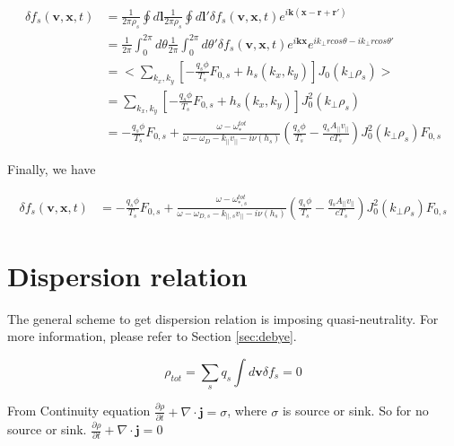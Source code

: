 \begin{equation}
\begin{aligned}
    \delta f_s(\textbf{v},\textbf{x},t){}&=
    \frac{1}{2\pi \rho_s}\oint d \textbf{l}
    \frac{1}{2\pi \rho_s}\oint d \textbf{l}'
    \delta f_s(\textbf{v},\textbf{x},t)e^{i\textbf{k}(\textbf{x}-\textbf{r}+\textbf{r}')}\\
    &=\frac{1}{2\pi}\int ^{2\pi}_{0}d \theta
    \frac{1}{2\pi}\int ^{2\pi}_{0}d \theta'
    \delta f_s(\textbf{v},\textbf{x},t)
    e^{i\textbf{kx}}e^{ik_\perp rcos\theta - ik_\perp rcos\theta'}
    \\
    &=<\sum_{k_x,k_y}\left[ -\frac{q_s\phi}{T_s}F_{0,s}+h_s(k_x, k_y)
    \right]J_0(k_\perp\rho_s)>\\
    &=\sum_{k_x,k_y}\left[ -\frac{q_s\phi}{T_s}F_{0,s}+h_s(k_x, k_y)
    \right]J_0^2(k_\perp\rho_s)\\
    &=-\frac{q_s\phi}{T_s}F_{0,s}+\frac{\omega -\omega_*^{tot} 
    }{\omega -\omega_D 
    - k_{||}v_{||}-i\nu(h_s)}\left(\frac{q_s\phi}{T_s}-\frac{q_sA_{||}v_{||}}{cT_s}\right)J_0^2(k_\perp\rho_s)F_{0,s}
\end{aligned}
\end{equation}

Finally, we have

\begin{equation}
\begin{aligned}
    \delta f_s(\textbf{v},\textbf{x},t){}&=-\frac{q_s\phi}{T_s}F_{0,s}+\frac{\omega -\omega_{*,s}^{tot} 
    }{\omega -\omega_{D,s}
    - k_{||,s}v_{||}-i\nu(h_s)}\left(\frac{q_s\phi}{T_s}-\frac{q_sA_{||}v_{||}}{cT_s}\right)J_0^2(k_\perp\rho_s)F_{0,s}
\end{aligned}
\label{eq:linear}
\end{equation}

\section{Dispersion relation}

The general scheme to get dispersion relation is imposing quasi-neutrality. For more information, please refer to Section \ref{sec:debye}. 

\begin{equation}
    \rho_{tot}=\sum_{s} q_s\int d\textbf{v} \delta f_s=0
    \label{eq:rho=0}
\end{equation}

From Continuity equation $\frac{\partial \rho}{\partial t}+\nabla \cdot \textbf{j}=\sigma$, where $\sigma$ is source or sink. So for no source or sink. $\frac{\partial \rho}{\partial t}+\nabla \cdot \textbf{j}=0$ 

